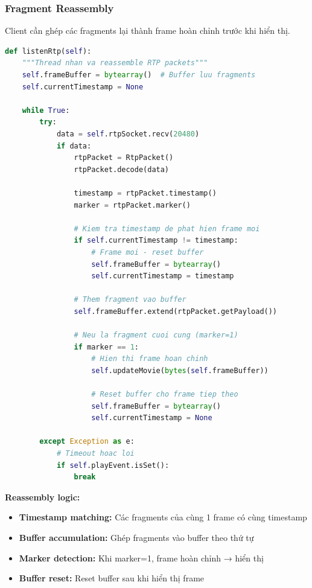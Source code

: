 \documentclass[a4paper,12pt]{article}
\begin{document}
\subsubsection{Fragment Reassembly}

Client cần ghép các fragments lại thành frame hoàn chỉnh trước khi hiển thị.

\begin{lstlisting}[language=Python, caption={Fragment Reassembly Logic}]
def listenRtp(self):
    """Thread nhan va reassemble RTP packets"""
    self.frameBuffer = bytearray()  # Buffer luu fragments
    self.currentTimestamp = None
    
    while True:
        try:
            data = self.rtpSocket.recv(20480)
            if data:
                rtpPacket = RtpPacket()
                rtpPacket.decode(data)
                
                timestamp = rtpPacket.timestamp()
                marker = rtpPacket.marker()
                
                # Kiem tra timestamp de phat hien frame moi
                if self.currentTimestamp != timestamp:
                    # Frame moi - reset buffer
                    self.frameBuffer = bytearray()
                    self.currentTimestamp = timestamp
                
                # Them fragment vao buffer
                self.frameBuffer.extend(rtpPacket.getPayload())
                
                # Neu la fragment cuoi cung (marker=1)
                if marker == 1:
                    # Hien thi frame hoan chinh
                    self.updateMovie(bytes(self.frameBuffer))
                    
                    # Reset buffer cho frame tiep theo
                    self.frameBuffer = bytearray()
                    self.currentTimestamp = None
                    
        except Exception as e:
            # Timeout hoac loi
            if self.playEvent.isSet():
                break
\end{lstlisting}

\textbf{Reassembly logic:}
\begin{itemize}
    \item \textbf{Timestamp matching:} Các fragments của cùng 1 frame có cùng timestamp
    \item \textbf{Buffer accumulation:} Ghép fragments vào buffer theo thứ tự
    \item \textbf{Marker detection:} Khi marker=1, frame hoàn chỉnh → hiển thị
    \item \textbf{Buffer reset:} Reset buffer sau khi hiển thị frame
\end{itemize}
\end{document}
